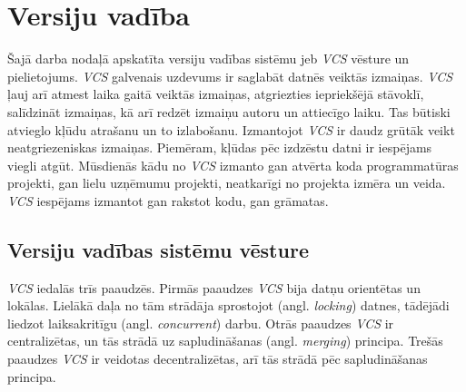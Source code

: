 \chapter{Versiju vadība}


Šajā darba nodaļā apskatīta versiju vadības sistēmu jeb \textit{VCS} vēsture un pielietojums. \textit{VCS} galvenais uzdevums ir saglabāt datnēs veiktās izmaiņas. \textit{VCS} ļauj arī atmest laika gaitā veiktās izmaiņas, atgriezties iepriekšējā stāvoklī, salīdzināt izmaiņas, kā arī redzēt izmaiņu autoru un attiecīgo laiku. Tas būtiski atvieglo kļūdu atrašanu un to izlabošanu. Izmantojot \textit{VCS} ir daudz grūtāk veikt neatgriezeniskas izmaiņas. Piemēram, kļūdas pēc izdzēstu datni ir iespējams viegli atgūt. Mūsdienās kādu no \textit{VCS} izmanto gan atvērta koda programmatūras projekti, gan lielu uzņēmumu projekti, neatkarīgi no projekta izmēra un veida. \textit{VCS} iespējams izmantot gan rakstot kodu, gan grāmatas. \cite{chacon2014progit}

\section{Versiju vadības sistēmu vēsture}
\textit{VCS} iedalās trīs paaudzēs. Pirmās paaudzes \textit{VCS} bija datņu orientētas un lokālas. Lielākā daļa no tām strādāja sprostojot (angl. \textit{locking}) datnes, tādējādi liedzot laiksakritīgu (angl. \textit{concurrent}) darbu.
Otrās paaudzes \textit{VCS} ir centralizētas, un tās strādā uz sapludināšanas (angl. \textit{merging}) principa.
Trešās paaudzes \textit{VCS} ir veidotas decentralizētas, arī tās strādā pēc sapludināšanas principa.
\cite{raymondVCS}
